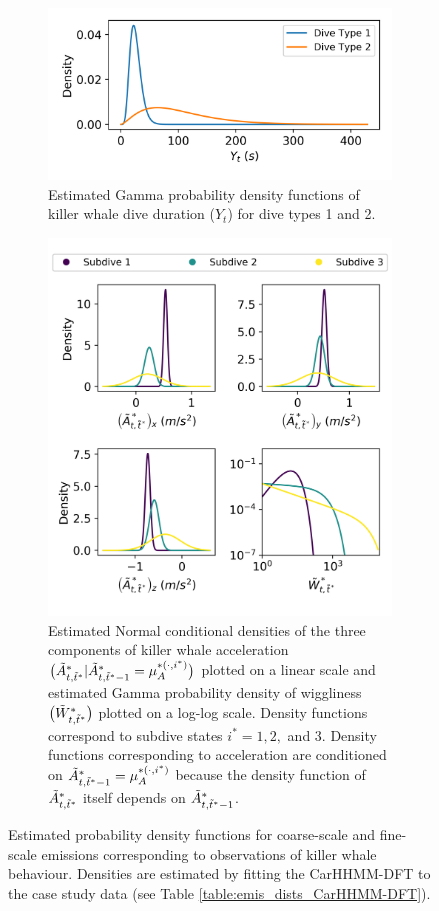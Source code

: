 \begin{figure}[ht]
    \begin{subfigure}{\textwidth}
    	\centering
    	\includegraphics[width=4in]{../Plots/CarHHMM2-coarse-emissions.png}
    	\caption{Estimated Gamma probability density functions of killer whale dive duration ($Y_t$) for dive types 1 and 2.}
    	\label{fig:coarse_emis}
    \end{subfigure}
    \newline
    \begin{subfigure}{\textwidth}
    	\centering
    	\includegraphics[width=4in]{../Plots/CarHHMM2-fine-emissions.png}
    	\caption{Estimated Normal conditional densities of the three components of killer whale acceleration $\big(\tilde{A}^*_{t,\tilde t^*}|\tilde{A}^*_{t,\tilde t^*-1} = \mu_A^{*(\cdot,i^*)}\big)$ plotted on a linear scale and estimated Gamma probability density of wiggliness $\big(\tilde{W}^*_{t,\tilde t^*}\big)$ plotted on a log-log scale. Density functions correspond to subdive states $i^* = 1,2,$ and $3$. Density functions corresponding to acceleration are conditioned on $\tilde{A}^*_{t,\tilde t^*-1} = \mu_A^{*(\cdot,i^*)}$ because the density function of $\tilde{A}^*_{t,\tilde t^*}$ itself depends on $\tilde{A}^*_{t,\tilde t^*-1}$.}
    	\label{fig:fine_emis}
    \end{subfigure}
    \caption{Estimated probability density functions for coarse-scale and fine-scale emissions corresponding to observations of killer whale behaviour. Densities are estimated by fitting the CarHHMM-DFT to the case study data (see Table \ref{table:emis_dists_CarHHMM-DFT}).}
    \label{fig:emis}
\end{figure}

